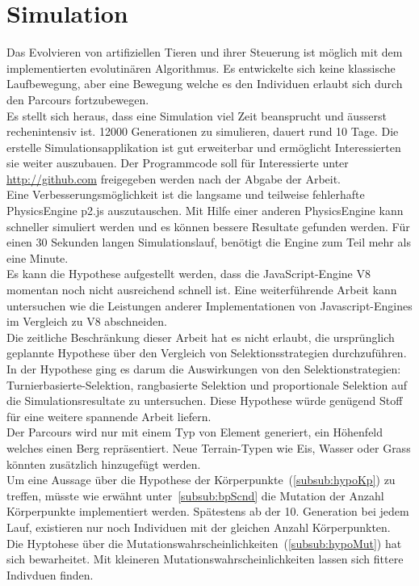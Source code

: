   \section{Simulation}
    Das Evolvieren von artifiziellen Tieren und ihrer Steuerung ist möglich mit dem implementierten evolutinären Algorithmus.
    Es entwickelte sich keine klassische Laufbewegung, aber eine Bewegung welche es den Individuen erlaubt sich durch den Parcours fortzubewegen.
    \\
    Es stellt sich heraus, dass eine Simulation viel Zeit beansprucht und äusserst rechenintensiv ist.
    12000 Generationen zu simulieren, dauert rund 10 Tage.
    Die erstelle Simulationsapplikation ist gut erweiterbar und ermöglicht Interessierten sie weiter auszubauen.
    Der Programmcode soll für Interessierte unter \url{http://github.com} freigegeben werden nach der Abgabe der Arbeit.
    \\
    Eine Verbesserungsmöglichkeit ist die langsame und teilweise fehlerhafte \gls{PhysicsEngine} p2.js auszutauschen.
    Mit Hilfe einer anderen \gls{PhysicsEngine} kann schneller simuliert werden und es können bessere Resultate gefunden werden.
    Für einen 30 Sekunden langen Simulationslauf, benötigt die Engine zum Teil mehr als eine Minute.
    \\
    Es kann die Hypothese aufgestellt werden, dass die JavaScript-Engine V8 momentan noch nicht ausreichend schnell ist.
    Eine weiterführende Arbeit kann untersuchen wie die Leistungen anderer Implementationen von Javascript-Engines im
    Vergleich zu V8 abschneiden.
    \\
    Die zeitliche Beschränkung dieser Arbeit hat es nicht erlaubt,
    die ursprünglich geplannte Hypothese über den Vergleich von Selektionsstrategien durchzuführen.
    In der Hypothese ging es darum die Auswirkungen von den Selektionstrategien: Turnierbasierte-Selektion, rangbasierte Selektion
    und proportionale Selektion auf die Simulationsresultate zu untersuchen.
    Diese Hypothese würde genügend Stoff für eine weitere spannende Arbeit liefern.
    \\
    Der Parcours wird nur mit einem Typ von Element generiert, ein Höhenfeld welches einen Berg repräsentiert.
    Neue Terrain-Typen wie Eis, Wasser oder Grass könnten zusätzlich hinzugefügt werden.
    \\
    Um eine Aussage über die Hypothese der Körperpunkte~(\vref{subsub:hypoKp}) zu treffen,
    müsste wie erwähnt unter~\vref{subsub:bpScnd} die Mutation der Anzahl Körperpunkte implementiert werden.
    Spätestens ab der 10. Generation bei jedem Lauf, existieren nur noch Individuen mit der gleichen Anzahl Körperpunkten.
    \\
    Die Hyptohese über die Mutationswahrscheinlichkeiten~(\vref{subsub:hypoMut}) hat sich bewarheitet.
    Mit kleineren Mutationswahrscheinlichkeiten lassen sich fittere Indivduen finden.

